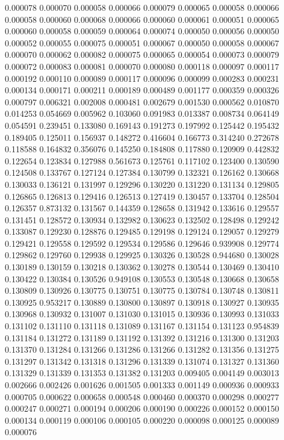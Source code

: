 0.000078
0.000070
0.000058
0.000066
0.000079
0.000065
0.000058
0.000066
0.000058
0.000060
0.000068
0.000066
0.000060
0.000061
0.000051
0.000065
0.000060
0.000058
0.000059
0.000064
0.000074
0.000050
0.000056
0.000050
0.000052
0.000055
0.000075
0.000051
0.000067
0.000050
0.000058
0.000067
0.000070
0.000062
0.000082
0.000075
0.000065
0.000054
0.000073
0.000079
0.000072
0.000083
0.000081
0.000070
0.000080
0.000118
0.000097
0.000117
0.000192
0.000110
0.000089
0.000117
0.000096
0.000099
0.000283
0.000231
0.000134
0.000171
0.000211
0.000189
0.000489
0.001177
0.000359
0.000326
0.000797
0.006321
0.002008
0.000481
0.002679
0.001530
0.000562
0.010870
0.014253
0.054669
0.005962
0.103060
0.091983
0.013387
0.008734
0.064149
0.054591
0.239451
0.133080
0.169143
0.191273
0.197992
0.125442
0.195432
0.189405
0.125011
0.156937
0.148272
0.416604
0.166773
0.314240
0.272678
0.118588
0.164832
0.356076
0.145250
0.184808
0.117880
0.120909
0.442832
0.122654
0.123834
0.127988
0.561673
0.125761
0.117102
0.123400
0.130590
0.124508
0.133767
0.127124
0.127384
0.130799
0.132321
0.126162
0.130668
0.130033
0.136121
0.131997
0.129296
0.130220
0.131220
0.131134
0.129805
0.126865
0.126813
0.129416
0.126513
0.127419
0.130457
0.133704
0.128504
0.126357
0.873132
0.131567
0.144359
0.128658
0.131942
0.133616
0.129557
0.131451
0.128572
0.130934
0.132982
0.130623
0.132502
0.128498
0.129242
0.133087
0.129230
0.128876
0.129485
0.129198
0.129124
0.129057
0.129279
0.129421
0.129558
0.129592
0.129534
0.129586
0.129646
0.939908
0.129774
0.129862
0.129760
0.129938
0.129925
0.130326
0.130528
0.944680
0.130028
0.130189
0.130159
0.130218
0.130362
0.130278
0.130544
0.130469
0.130410
0.130422
0.130384
0.130526
0.949108
0.130553
0.130548
0.130668
0.130658
0.130809
0.130926
0.130775
0.130751
0.130775
0.130784
0.130748
0.130811
0.130925
0.953217
0.130889
0.130800
0.130897
0.130918
0.130927
0.130935
0.130968
0.130932
0.131007
0.131030
0.131015
0.130936
0.130993
0.131033
0.131102
0.131110
0.131118
0.131089
0.131167
0.131154
0.131123
0.954839
0.131184
0.131272
0.131189
0.131192
0.131392
0.131216
0.131300
0.131203
0.131370
0.131284
0.131266
0.131286
0.131266
0.131282
0.131356
0.131275
0.131297
0.131342
0.131318
0.131296
0.131339
0.131074
0.131327
0.131360
0.131329
0.131339
0.131353
0.131382
0.131203
0.009405
0.004149
0.003013
0.002666
0.002426
0.001626
0.001505
0.001333
0.001149
0.000936
0.000933
0.000705
0.000622
0.000658
0.000548
0.000460
0.000370
0.000298
0.000277
0.000247
0.000271
0.000194
0.000206
0.000190
0.000226
0.000152
0.000150
0.000134
0.000119
0.000106
0.000105
0.000220
0.000098
0.000125
0.000089
0.000076
